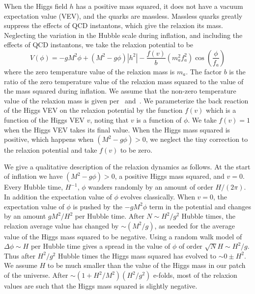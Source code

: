 \documentclass[12pt,aps,prd,showpacs,notitlepage,nofootinbib]{revtex4-1}
\newcommand{\beq}{\begin{equation}}
\newcommand{\eeq}{\end{equation}}
\begin{document}
 When the Higgs field $h$ has a positive mass squared, it does not have a vacuum expectation value (VEV), and the quarks are massless. Massless quarks greatly suppress the effects of QCD instantons, which give the relaxion its mass. Neglecting the variation in the Hubble scale during inflation, and including the effects of QCD instantons, we take the relaxion potential to be
\beq
V(\phi) = -g M^2 \phi + (M^2-g\phi) |h^2| - \frac{f(v)}{b}(m_a^2 f_a^2)\cos\left(\frac{\phi}{f_a}\right)
 \eeq
 where the zero temperature value of the relaxion mass is $m_a$. The factor $b$ is the ratio of the zero temperature value of the relaxion mass squared to the value of the mass squared during inflation. We assume that the non-zero temperature value of the relaxion mass is given per~\cite{Preskill:1982cy} and~\cite{Gross:1980br}.   We parameterize the back reaction of the Higgs VEV on the relaxion potential by the function $f(v)$ which is a function of the Higgs VEV $v$, noting that $v$ is a function of $\phi$.  We take $f(v)=1$ when the Higgs VEV takes its final value.  When  the Higgs mass squared is positive, which happens when $ (M^2-g\phi) >0$, we neglect the tiny correction to the relaxion potential and take $f(v)$ to be zero.
 
 We give a qualitative description of the relaxion dynamics as follows. At the start of inflation we have $(M^2-g\phi)>0$,  a positive Higgs mass squared, and $v=0$. Every Hubble time, $H^{-1}$,  $\phi$ wanders randomly by an amount of order $H/(2\pi)$. In addition   the expectation value of $\phi$ evolves classically. When $v=0$, the expectation value of $\phi$ is    pushed by the $-g M^2 \phi $ term in the potential and changes  by an amount $g M^2/H^2$ per Hubble time.  After $N\sim H^2/g^2$ Hubble times, the relaxion average value has  changed by  $\sim (M^2/g)$, as needed for the average value of the Higgs mass squared to be negative. Using a random walk model of $\Delta\phi\sim H$ per Hubble time gives a spread in the value of $\phi $ of order $\sqrt{N}H\sim H^2/g$. Thus after $H^2/g^2$ Hubble times the Higgs mass squared has evolved to $\sim 0\pm H^2$.  We assume $H$ to be much smaller than the value of the Higgs mass in our patch of the universe. After $\sim (1+ H^2/M^2)(H^2/g^2) $ e-folds, most of the relaxion values are such that the Higgs mass squared is slightly negative. 
 
\end{document}
